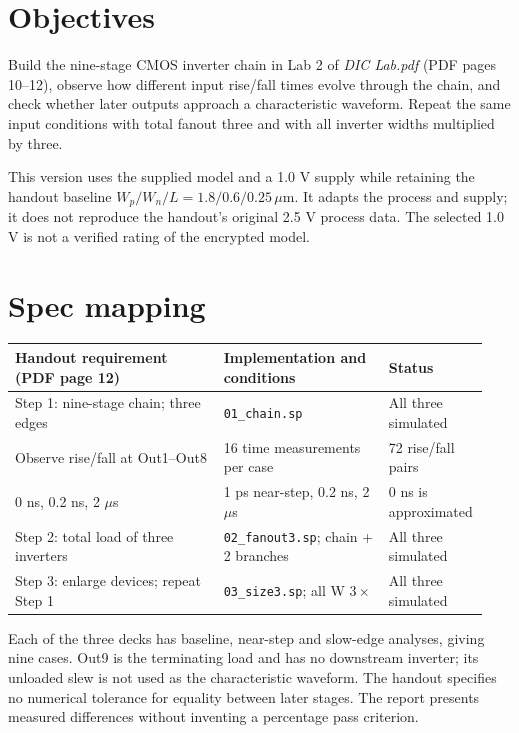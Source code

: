 \section{Objectives}
Build the nine-stage CMOS inverter chain in Lab 2 of \textit{DIC Lab.pdf} (PDF pages 10--12), observe how different input rise/fall times evolve through the chain, and check whether later outputs approach a characteristic waveform. Repeat the same input conditions with total fanout three and with all inverter widths multiplied by three.

This version uses the supplied model and a 1.0 V supply while retaining the handout baseline $W_p/W_n/L=1.8/0.6/0.25\,\mu\mathrm m$. It adapts the process and supply; it does not reproduce the handout's original 2.5 V process data. The selected 1.0 V is not a verified rating of the encrypted model.

\section{Spec mapping}
\begin{center}
\setlength{\tabcolsep}{3pt}
\begin{tabular}{p{0.43\linewidth}p{0.34\linewidth}p{0.17\linewidth}}
\toprule
Handout requirement (PDF page 12) & Implementation and conditions & Status \\
\midrule
Step 1: nine-stage chain; three edges & \texttt{01\_chain.sp} & All three simulated \\
Observe rise/fall at Out1--Out8 & 16 time measurements per case & 72 rise/fall pairs \\
0 ns, 0.2 ns, 2 $\mu$s & 1 ps near-step, 0.2 ns, 2 $\mu$s & 0 ns is approximated \\
Step 2: total load of three inverters & \texttt{02\_fanout3.sp}; chain + 2 branches & All three simulated \\
Step 3: enlarge devices; repeat Step 1 & \texttt{03\_size3.sp}; all W $3\times$ & All three simulated \\
\bottomrule
\end{tabular}
\end{center}

Each of the three decks has baseline, near-step and slow-edge analyses, giving nine cases. Out9 is the terminating load and has no downstream inverter; its unloaded slew is not used as the characteristic waveform. The handout specifies no numerical tolerance for equality between later stages. The report presents measured differences without inventing a percentage pass criterion.

